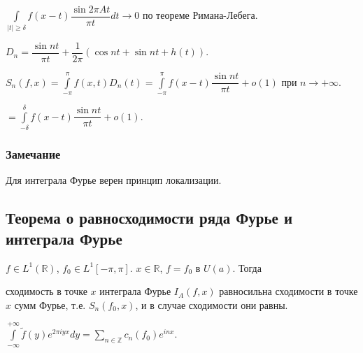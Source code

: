 \documentclass{article}
\begin{document}
            $\int\limits_{|t| \geqslant \delta} f(x - t) \dfrac{\sin 2 \pi A t}{\pi t} dt \rightarrow 0$ по теореме Римана-Лебега.
            
    $D_n = \dfrac{\sin {nt}}{\pi t} + \dfrac{1}{2 \pi} (\cos {nt} + \sin {nt} + h(t))$.
    
    $S_n(f, x) = \int\limits^{\pi}_{-\pi} f(x, t) D_n(t) = \int\limits^{\pi}_{-\pi} f(x - t) \dfrac{\sin nt}{\pi t} + o(1)$ при $n \rightarrow +\infty$.
    
    $= \int\limits^{\delta}_{-\delta} f(x - t) \dfrac{\sin {nt}}{\pi t} + o(1)$.
            
        \subsubsection{Замечание}
        
            Для интеграла Фурье верен принцип локализации.
            
    \subsection{Теорема о равносходимости ряда Фурье и интеграла Фурье}
    
        $f \in L^1 \left( \mathbb{R} \right)$, $f_0 \in L^1 [-\pi, \pi]$. $x \in \mathbb{R}$, $f = f_0$ в $U(a)$. Тогда
        
        сходимость в точке $x$ интеграла Фурье $I_A(f, x)$ равносильна сходимости в точке $x$ сумм Фурье, т.е. $S_n(f_0, x)$, и в случае сходимости они равны.
        
        $\int\limits^{+\infty}_{-\infty} \widetilde{f}(y) e^{2 \pi i y x} dy = \sum\limits_{n \in \mathbb{Z}} c_n(f_0) e^{i nx}$.
        
\end{document}
